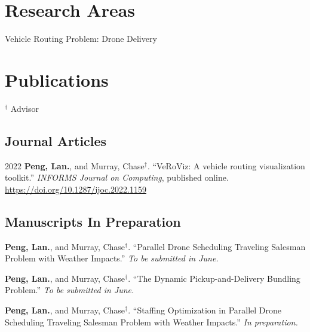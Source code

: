 \documentclass[12pt,letterpaper]{report}
\newcommand{\listitemspace}{0.25em}
\renewenvironment{itemize}
{\begin{list}{}{\setlength{\leftmargin}{0em}
                \setlength{\parskip}{0em}
                \setlength{\itemsep}{\listitemspace}
                \setlength{\parsep}{\listitemspace}}}
{\end{list}}
\begin{document}
    \section*{Research Areas}
    \begin{itemize}
        \item Vehicle Routing Problem: Drone Delivery
    \end{itemize}

    \section*{Publications}
    $^\dagger$ Advisor
    \subsection*{Journal Articles}
    \begin{tablist}
        \item[2022] \tab{}\textbf{Peng, Lan.}, and Murray, Chase$^\dagger$. \enquote{VeRoViz: A vehicle routing visualization toolkit.} \textit{INFORMS Journal on Computing}, published online. \href{https://pubsonline.informs.org/doi/abs/10.1287/ijoc.2022.1159}{https://doi.org/10.1287/ijoc.2022.1159}
    \end{tablist}

    \subsection*{Manuscripts In Preparation}
    \begin{tablist}
    \item[\the\year] \tab{}\textbf{Peng, Lan.}, and Murray, Chase$^\dagger$. \enquote{Parallel Drone Scheduling Traveling Salesman Problem with Weather Impacts.} \textit{To be submitted in June.}
    \item[\the\year] \tab{}\textbf{Peng, Lan.}, and Murray, Chase$^\dagger$. \enquote{The Dynamic Pickup-and-Delivery Bundling Problem.} \textit{To be submitted in June.}
    \item[\the\year] \tab{}\textbf{Peng, Lan.}, and Murray, Chase$^\dagger$. \enquote{Staffing Optimization in Parallel Drone Scheduling Traveling Salesman Problem with Weather Impacts.} \textit{In preparation.}
    \end{tablist}
\end{document}

